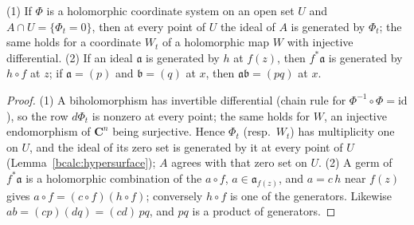 \begin{lemma}
\label{bcalc:hyperplane-ideal}
\leanok
(1) If \(\Phi\) is a holomorphic coordinate system on an open set \(U\) and \(A\cap U=\{\Phi_t=0\}\), then at every point of \(U\) the ideal of \(A\) is
generated by \(\Phi_t\); the same holds for a coordinate \(W_t\) of a holomorphic map \(W\) with injective differential. (2) If an ideal \(\mathfrak a\) is
generated by \(h\) at \(f(z)\), then \(f^*\mathfrak a\) is generated by \(h\circ f\) at \(z\); if \(\mathfrak a=(p)\) and \(\mathfrak b=(q)\) at \(x\), then
\(\mathfrak a\mathfrak b=(pq)\) at \(x\).
\end{lemma}
\begin{proof}
\leanok
(1) A biholomorphism has invertible differential (chain rule for \(\Phi^{-1}\circ\Phi=\mathrm{id}\)), so the row \(d\Phi_t\) is nonzero at every point; the
same holds for \(W\), an injective endomorphism of \(\mathbf C^n\) being surjective. Hence \(\Phi_t\) (resp.\ \(W_t\)) has multiplicity one on \(U\), and
the ideal of its zero set is generated by it at every point of \(U\) (Lemma~\ref{bcalc:hypersurface}); \(A\) agrees with that zero set on \(U\).
(2) A germ of \(f^*\mathfrak a\) is a holomorphic combination of the \(a\circ f\), \(a\in\mathfrak a_{f(z)}\), and \(a=c\,h\) near \(f(z)\) gives
\(a\circ f=(c\circ f)(h\circ f)\); conversely \(h\circ f\) is one of the generators. Likewise \(ab=(cp)(dq)=(cd)\,pq\), and \(pq\) is a product of
generators.
\end{proof}

